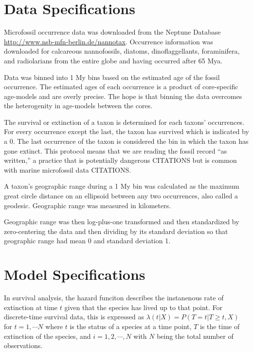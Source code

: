 \documentclass[12pt,letterpaper]{article}
\begin{document}
\section{Data Specifications}

Microfossil occurrence data was downloaded from the Neptune Database \url{http://www.nsb-mfn-berlin.de/nannotax}. Occurrence information was downloaded for calcareous nannofossils, diatoms, dinoflaggellants, foraminifera, and radiolarians from the entire globe and having occurred after 65 Mya.

Data was binned into 1 My bins based on the estimated age of the fossil occurrence. The estimated ages of each occurrence is a product of core-specific age-models and are overly precise. The hope is that binning the data overcomes the heterogenity in age-models between the cores. 


The survival or extinction of a taxon is determined for each taxons' occurrences. For every occurrence except the last, the taxon has survived which is indicated by a 0. The last occurrence of the taxon is considered the bin in which the taxon has gone extinct. This protocol means that we are reading the fossil record ``as written,'' a practice that is potentially dangerous CITATIONS but is common with marine microfossil data CITATIONS.

A taxon's geographic range during a 1 My bin was calculated as the maximum great circle distance on an ellipsoid between any two occurrences, also called a geodesic. Geographic range was measured in kilometers.

Geographic range was then log-plus-one transformed and then standardized by zero-centering the data and then dividing by its standard deviation so that geographic range had mean 0 and standard deviation 1.


\section{Model Specifications}

In survival analysis, the hazard funciton describes the instanenous rate of extinction at time \(t\) given that the species has lived up to that point. For discrete-time survival data, this is expressed as \(\lambda(t | X) = P(T = t | T \geq t, X)\) for \(t = 1, \cdots N\) where \(t\) is the status of a species at a time point, \(T\) is the time of extinction of the species, and \(i = 1, 2, \cdots, N\) with \(N\) being the total number of observations. 
\end{document}
